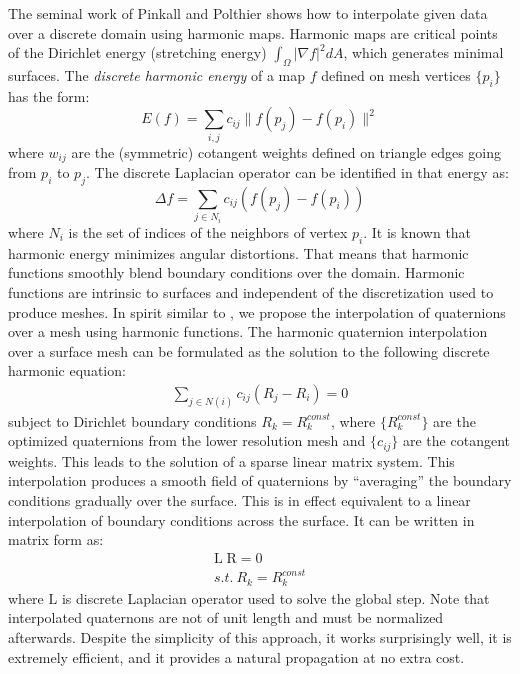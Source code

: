 \documentclass{birkjour}
\numberwithin{equation}{section}
\begin{document}
The seminal work of Pinkall and Polthier \cite{Pinkall1993} shows how to interpolate given data over a discrete domain using harmonic maps. Harmonic maps are critical points of the Dirichlet energy (stretching energy) $\int_{\Omega}{ |\nabla f|^2 dA }$, which generates minimal surfaces. 
The \emph{discrete harmonic energy} of a map $f$ defined on mesh vertices $\{p_i\}$ has the form:
\begin{equation}
E(f) = \sum_{i,j}{c_{ij} \| f(p_j) - f(p_i) \|^2 }
\end{equation}
where $w_{ij}$ are the (symmetric) cotangent weights \cite{Pinkall1993} defined on triangle edges going from $p_i$ to $p_j$. The discrete Laplacian operator can be identified in that energy as:
\begin{equation}
\Delta f = \sum_{j \in N_i} { c_{ij} ( f(p_j) - f(p_i) ) }
\end{equation}
where $N_i$ is the set of indices of the neighbors of vertex $p_i$. It is known that harmonic energy minimizes angular distortions. That means that harmonic functions smoothly blend boundary conditions over the domain. Harmonic functions are intrinsic to surfaces and independent of the discretization used to produce meshes. In spirit similar to \cite{Zayer2005}, we propose the interpolation of quaternions over a mesh using harmonic functions. The harmonic quaternion interpolation over a surface mesh can be formulated as the solution to the following discrete harmonic equation:
\begin{eqnarray}
\label{eq:harmonic_rotor}
   \sum_{j \in N(i)} { c_{ij} ( R_j - R_i ) } = 0
\end{eqnarray}
subject to Dirichlet boundary conditions $R_k = R^{const}_k$, where $\{R^{const}_k\}$ are the optimized quaternions from the lower resolution mesh and $\{c_{ij}\}$ are the cotangent weights. This leads to the solution of a sparse linear matrix system. This interpolation produces a smooth field of quaternions by ``averaging'' the boundary conditions gradually over the surface. This is in effect equivalent to a linear interpolation of boundary conditions across the surface. It can be written in matrix form as:
\begin{eqnarray}
	\mathrm L \; \mathrm R = 0\\
	s.t. \ R_k = R^{const}_k \nonumber
\end{eqnarray}
where $\mathrm L$ is discrete Laplacian operator used to solve the global step. Note that interpolated quaternons are not of unit length and must be normalized afterwards. Despite the simplicity of this approach, it works surprisingly well, it is extremely efficient, and it provides a natural propagation at no extra cost.
\end{document}
